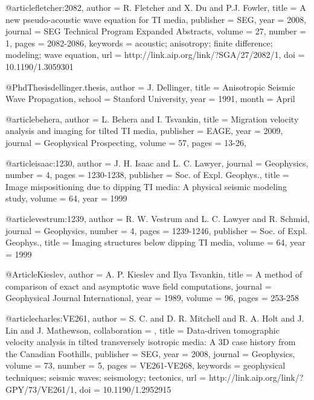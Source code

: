 {@article{fletcher:2082,
  author =	 {R. Fletcher and X. Du and P.J. Fowler},
  title =	 {A new pseudo-acoustic wave equation for {TI} media},
  publisher =	 {SEG},
  year =	 2008,
  journal =	 {SEG Technical Program Expanded Abstracts},
  volume =	 27,
  number =	 1,
  pages =	 {2082-2086},
  keywords =	 {acoustic; anisotropy; finite difference; modeling;
                  wave equation},
  url =		 {http://link.aip.org/link/?SGA/27/2082/1},
  doi =		 {10.1190/1.3059301}
}

@PhdThesis{dellinger.thesis,
  author =	 {J. Dellinger},
  title =	 {Anisotropic Seismic Wave Propagation},
  school =	 {Stanford University},
  year =	 1991,
  month =	 {April}
}

@article{behera,
  author =	 {L. Behera and I. Tsvankin},
  title =	 {Migration velocity analysis and imaging for tilted
                  {TI} media},
  publisher =	 {EAGE},
  year =	 2009,
  journal =	 {Geophysical Prospecting},
  volume =	 57,
  pages =	 {13-26},
}

@article{isaac:1230,
  author =	 {J. H. Isaac and L. C. Lawyer},
  journal =	 {Geophysics},
  number =	 4,
  pages =	 {1230-1238},
  publisher =	 {Soc. of Expl. Geophys.},
  title =	 {Image mispositioning due to dipping {TI} media: {A}
                  physical seismic modeling study},
  volume =	 64,
  year =	 1999
}

@article{vestrum:1239,
  author =	 {R. W. Vestrum and L. C. Lawyer and R. Schmid},
  journal =	 {Geophysics},
  number =	 4,
  pages =	 {1239-1246},
  publisher =	 {Soc. of Expl. Geophys.},
  title =	 {Imaging structures below dipping {TI} media},
  volume =	 64,
  year =	 1999
}

@Article{Kieslev,
  author =	 {A. P. Kieslev and Ilya Tsvankin},
  title =	 {A method of comparison of exact and asymptotic wave
                  field computations},
  journal =	 {Geophysical Journal International},
  year =	 1989,
  volume =	 96,
  pages =	 {253-258}
}

@article{charles:VE261,
author = {S. C. and D. R. Mitchell and R. A. Holt and
                  J. Lin and J. Mathewson},
collaboration = {},
title = {Data-driven tomographic velocity analysis in tilted
                  transversely isotropic media: A 3D case history from
                  the Canadian Foothills},
publisher = {SEG},
year = {2008},
journal = {Geophysics},
volume = {73},
number = {5},
pages = {VE261-VE268},
keywords = {geophysical techniques; seismic waves; seismology; tectonics},
url = {http://link.aip.org/link/?GPY/73/VE261/1},
doi = {10.1190/1.2952915}
}



}
